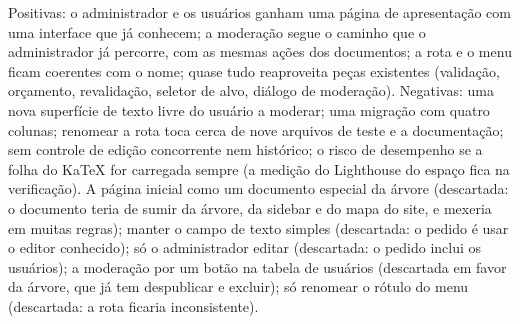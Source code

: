 {Positivas: o administrador e os usuários ganham uma página de apresentação com uma interface que já conhecem; a moderação segue o caminho que o administrador já percorre, com as mesmas ações dos documentos; a rota e o menu ficam coerentes com o nome; quase tudo reaproveita peças existentes (validação, orçamento, revalidação, seletor de alvo, diálogo de moderação). Negativas: uma nova superfície de texto livre do usuário a moderar; uma migração com quatro colunas; renomear a rota toca cerca de nove arquivos de teste e a documentação; sem controle de edição concorrente nem histórico; o risco de desempenho se a folha do KaTeX for carregada sempre (a medição do Lighthouse do espaço fica na verificação).}
{A página inicial como um documento especial da árvore (descartada: o documento teria de sumir da árvore, da sidebar e do mapa do site, e mexeria em muitas regras); manter o campo de texto simples (descartada: o pedido é usar o editor conhecido); só o administrador editar (descartada: o pedido inclui os usuários); a moderação por um botão na tabela de usuários (descartada em favor da árvore, que já tem despublicar e excluir); só renomear o rótulo do menu (descartada: a rota ficaria inconsistente).}

\endgroup

